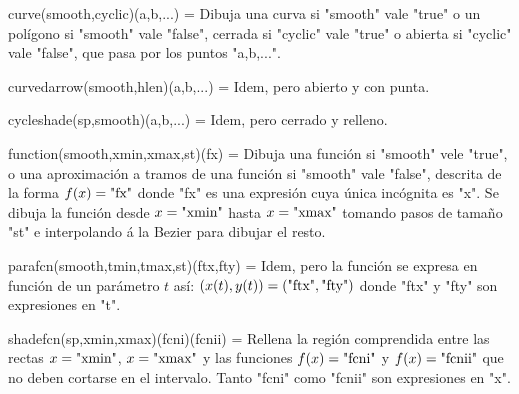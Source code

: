 \macro curve(smooth,cyclic)(a,b,...) = Dibuja una curva si "smooth"
vale "true" o un polígono si "smooth" vale "false", cerrada si
"cyclic" vale "true" o abierta si "cyclic" vale "false", que pasa
por los puntos "a,b,...".

\macro curvedarrow(smooth,hlen)(a,b,...) = Idem, pero abierto y con
punta.

\macro cycleshade(sp,smooth)(a,b,...) = Idem, pero cerrado y
relleno.

\macro function(smooth,xmin,xmax,st)(fx) = Dibuja una función si
"smooth" vele "true", o una aproximación a tramos de una función si
"smooth" vale "false", descrita de la forma $f(x) = \hbox{"fx"}$ donde "fx"
es una expresión {\MF} cuya única incógnita es "x".  Se dibuja la
función desde $x = \hbox{"xmin"}$ hasta $x = \hbox{"xmax"}$ tomando pasos de
tamaño "st" e interpolando á la Bezier para dibujar el resto.

\macro parafcn(smooth,tmin,tmax,st)(ftx,fty) = Idem, pero la función
se expresa en función de un parámetro $t$ así:  $(x(t),y(t)) =
(\hbox{"ftx"},\hbox{"fty"})$ donde "ftx" y "fty" son expresiones {\MF} en "t".

\macro shadefcn(sp,xmin,xmax)(fcni)(fcnii) = Rellena la región
comprendida entre las rectas $x = \hbox{"xmin"}$, $x = \hbox{"xmax"}$ y las
funciones $f(x) = \hbox{"fcni"}$ y $f(x) = \hbox{"fcnii"}$ que no deben cortarse
en el intervalo.  Tanto "fcni" como "fcnii" son expresiones {\MF} en
"x".

\bye
